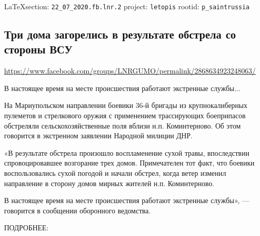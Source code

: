  
 
  
\vspace{0.5cm}
{\small\LaTeX section: \verb|22_07_2020.fb.lnr.2| project: \verb|letopis| rootid: \verb|p_saintrussia|}
\vspace{0.5cm}
  
\subsection{Три дома загорелись в результате обстрела со стороны ВСУ}
\url{https://www.facebook.com/groups/LNRGUMO/permalink/2868634923248063/}

В настоящее время на месте происшествия работают экстренные службы...

На Мариупольском направлении боевики 36-й бригады из крупнокалиберных пулеметов
и стрелкового оружия с применением трассирующих боеприпасов обстреляли
сельскохозяйственные поля вблизи н.п. Коминтерново. Об этом говорится в
экстренном заявлении Народной милиции ДНР.

«В результате обстрела произошло воспламенение сухой травы, впоследствии
спровоцировавшее возгорание трех домов. Примечателен тот факт, что боевики
воспользовались сухой погодой и начали обстрел, когда ветер изменил направление
в сторону домов мирных жителей н.п. Коминтерново.

В настоящее время на месте происшествия работают экстренные службы», —
говорится в сообщении оборонного ведомства.

ПОДРОБНЕЕ:
